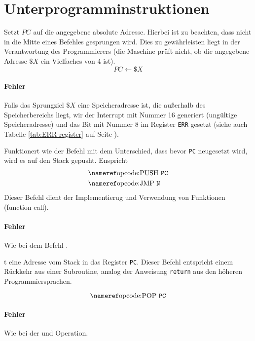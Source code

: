 \section{Unterprogramminstruktionen}

Setzt $PC$ auf die angegebene absolute Adresse. Hierbei ist zu beachten,  dass
nicht in die Mitte eines Befehles gesprungen wird. Dies zu gewährleisten liegt
in der Verantwortung des Programmierers (die Maschine prüft nicht, ob die
angegebene Adresse $\$X$ ein Vielfaches von 4 ist).
\[
    PC \gets \$X
\]

\paragraph{Fehler}
Falls das Sprungziel $\$X$ eine Speicheradresse ist, die außerhalb des
Speicherbereichs liegt, wir der Interrupt mit Nummer 16 generiert (ungültige
Speicheradresse) und das Bit mit Nummer 8 im Register \texttt{ERR} gesetzt
(siehe auch Tabelle \ref{tab:ERR-register} auf Seite
\pageref{tab:ERR-register}).


Funktionert wie der Befehl  mit dem Unterschied, dass bevor
\texttt{PC} neugesetzt wird, wird es auf den Stack gepusht. Enspricht
\begin{align*}
 & \text{\opref{PUSH} \texttt{PC}} \\
 & \text{\opref{JMP}  \texttt{N}} 
\end{align*}
Dieser Befehl dient der Implementierug und Verwendung von Funktionen (function
call).

\paragraph{Fehler}
Wie bei dem Befehl .


t eine Adresse vom Stack in das Register \texttt{PC}. Dieser Befehl
entspricht einem Rückkehr aus einer Subroutine, analog der Anweisung
\texttt{return} aus den höheren Programmiersprachen.

\[
  \text{\opref{POP} \texttt{PC}} 
\]

\paragraph{Fehler}
Wie bei der  und  Operation.



